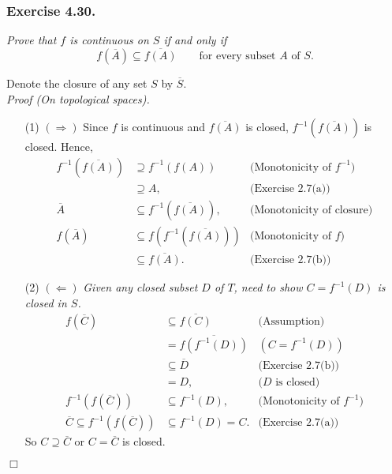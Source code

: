 \documentclass{article}
\begin{document}



\subsubsection*{Exercise 4.30.}
\emph{Prove that $f$ is continuous on $S$ if and only if
$$f(\overline{A}) \subseteq \overline{f(A)}
\qquad \text{for every subset $A$ of $S$}.$$}

Denote the closure of any set $S$ by $\overline{S}$. \\

\emph{Proof (On topological spaces).}
\begin{enumerate}
\item[(1)]
$(\Longrightarrow)$
Since $f$ is continuous and $\overline{f(A)}$ is closed,
$f^{-1}(\overline{f(A)})$ is closed.
Hence,
\begin{align*}
f^{-1}(\overline{f(A)})
&\supseteq f^{-1}(f(A))
  & \text{(Monotonicity of $f^{-1}$)} \\
&\supseteq A,
  & \text{(Exercise 2.7(a))} \\
\overline{A}
&\subseteq f^{-1}(\overline{f(A)}),
  & \text{(Monotonicity of closure)} \\
f(\overline{A})
&\subseteq f(f^{-1}(\overline{f(A)}))
  & \text{(Monotonicity of $f$)} \\
&\subseteq \overline{f(A)}.
  & \text{(Exercise 2.7(b))}
\end{align*}
\item[(2)]
$(\Longleftarrow)$
\emph{Given any closed subset $D$ of $T$, need to show
$C = f^{-1}(D)$ is closed in $S$.}
\begin{align*}
f(\overline{C})
&\subseteq \overline{f(C)}
  &\text{(Assumption)} \\
&= \overline{f(f^{-1}(D))}
  &(C = f^{-1}(D))\\
&\subseteq \overline{D}
  &\text{(Exercise 2.7(b))} \\
&= D,
  &\text{($D$ is closed)} \\
f^{-1}(f(\overline{C}))
&\subseteq f^{-1}(D),
  &\text{(Monotonicity of $f^{-1}$)} \\
\overline{C} \subseteq f^{-1}(f(\overline{C}))
&\subseteq f^{-1}(D) = C.
  &\text{(Exercise 2.7(a))}
\end{align*}
So $C \supseteq \overline{C}$ or $C = \overline{C}$ is closed.
\end{enumerate}
$\Box$ \\
\end{document}
